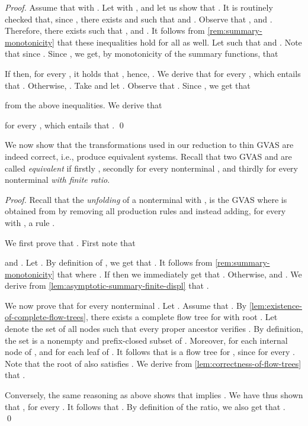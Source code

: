 \ratioinfinite*
\begin{proof}
  Assume that  with .
  Let  with ,
  and let us show that .
  It is routinely checked that,
  since ,
  there exists  and
   such that
   and
  .
  Observe that
  ,
   and
  .
  Therefore,
  there exists   such that
  ,
   and
  .
  It follows from \cref{rem:summary-monotonicity} that
  these inequalities hold for all  as well.
  Let  such that  and
  .
  Note that  since .
  Since ,
  we get, by monotonicity of the summary functions,
  that
  
  If  then, for every ,
  it holds that , hence, .
  We derive that  for every ,
  which entails that .
  Otherwise, .
  Take  and let
  .
  Observe that .
  Since ,
  we get that
  
  from the above inequalities.
  We derive that
  
  for every ,
  which entails that .
  \qed
\end{proof}

We now show that the transformations
used in our reduction to thin GVAS are indeed correct,
i.e., produce equivalent systems.
Recall that
two GVAS  and  are called
\emph{equivalent} if
firstly ,
secondly  for every nonterminal , and
thirdly  for every nonterminal  \emph{with finite ratio}.

\factsummarization*
\begin{proof}
Recall that
the \emph{unfolding}
of a nonterminal  with ,
is the GVAS  where
 is obtained from  by
removing all production rules  and
instead adding, for every 
with ,
a rule .

\smallskip

  We first prove that .
  First note that
  
  and
  .
  Let .
  By definition of ,
  we get that
  .
  It follows from \cref{rem:summary-monotonicity} that
   where
  .
  If  then we immediately get that
  .
  Otherwise,  and
  .
  We derive from \cref{lem:asymptotic-summary-finite-displ}
  that .

  \smallskip

  We now prove that 
  for every nonterminal .
  Let .
  Assume that .
  By \cref{lem:existence-of-complete-flow-trees},
  there exists a complete flow tree
   for 
  with root .
  Let  denote the set of all nodes  such that every
  proper ancestor  verifies .
  By definition,
  the set  is a nonempty and prefix-closed subset of .
  Moreover,
   for each internal node  of ,
  and  for each leaf  of .
  It follows that  is a flow tree for ,
  since  for every .
  Note that the root of  also satisfies .
  We derive from \cref{lem:correctness-of-flow-trees} that
  .

  Conversely,
  the same reasoning as above shows that 
  implies .
  We have thus shown that
  ,
  for every .
  It follows that .
  By definition of the ratio,
  we also get that .
  \qed
\end{proof}

